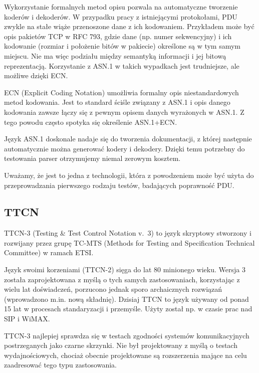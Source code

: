 \documentclass[00-praca-magisterska.tex]{subfiles}
\begin{document}
Wykorzystanie formalnych metod opisu pozwala na automatyczne tworzenie koderów i
dekoderów. W przypadku pracy z istniejącymi protokołami, PDU zwykle na stałe
wiąże przenoszone dane z ich kodowaniem. Przykładem może być opis pakietów TCP w
RFC 793, gdzie dane (np. numer sekwencyjny) i ich kodowanie (rozmiar i
położenie bitów w pakiecie) określone są w tym samym miejscu. Nie ma więc podziału między semantyką informacji i jej bitową reprezentacją. Korzystanie z ASN.1 w takich wypadkach jest
trudniejsze, ale możliwe dzięki ECN.

ECN (Explicit Coding Notation) umożliwia formalny opis niestandardowych metod
kodowania. Jest to standard ściśle związany z ASN.1 i opis danego kodowania
zawsze łączy się z pewnym opisem danych wyrażonych w ASN.1. Z tego powodu często
spotyka się określenie ASN.1+ECN.


Język ASN.1 doskonale nadaje się do tworzenia dokumentacji, z której następnie
automatycznie można generować kodery i dekodery. Dzięki temu potrzebny do
testowania parser otrzymujemy niemal zerowym kosztem.

Uważamy, że jest to jedna z technologii, która z powodzeniem może być użyta do
przeprowadzania pierwszego rodzaju testów, badających poprawność PDU.

\subsection{TTCN}

TTCN-3 (Testing \& Test Control Notation v.~3) to język skryptowy stworzony i
rozwijany przez grupę TC-MTS (Methods for Testing and Specification Technical
Committee) w ramach ETSI.

Język swoimi korzeniami (TTCN-2) sięga do lat 80 minionego wieku. Wersja 3
została zaprojektowana z myślą o tych samych zastosowaniach, korzystając z wielu
lat doświadczeń, porzucono jednak sporo archaicznych rozwiązań (wprowadzono
m.in. nową składnię). Dzisiaj TTCN to język używany od ponad 15 lat w procesach
standaryzacji i przemyśle. Użyty został np. w czasie prac nad SIP i WiMAX.

TTCN-3 najlepiej sprawdza się w testach zgodności systemów komunikacyjnych
postrzeganych jako czarne skrzynki. Nie był projektowany z myślą o testach
wydajnościowych, chociaż obecnie projektowane są rozszerzenia mające na celu
zaadresować tego typu zastosowania.
\end{document}
